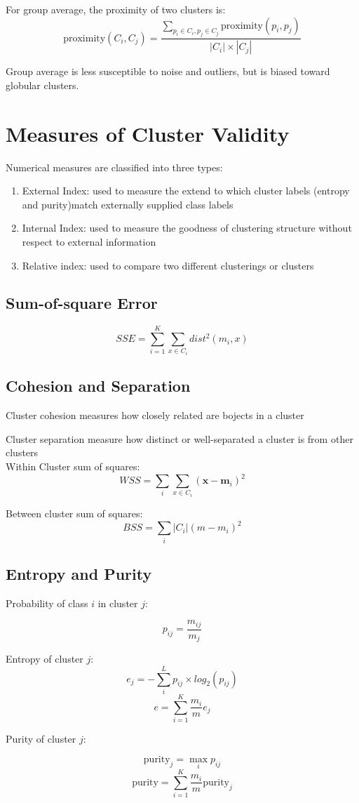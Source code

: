 \begin{multicols*}{2}
\noindent For group average, the proximity of two clusters is:
$$\text{proximity}(C_i, C_j) = \frac{\sum_{p_i \in C_i, p_j \in C_j} \text{proximity}(p_i,p_j)}{|C_i|\times|C_j|}$$

\noindent Group average is less susceptible to noise and outliers, but is biased toward globular clusters. 

\section{Measures of Cluster Validity}

\noindent Numerical measures are classified into three types:

\begin{enumerate}
    \item External Index: used to measure the extend to which cluster labels (entropy and purity)match externally supplied class labels
    \item Internal Index: used to measure the goodness of clustering structure without respect to external information
    \item Relative index: used to compare two different clusterings or clusters
\end{enumerate}

\subsection{Sum-of-square Error}

$$SSE=\sum_{i=1}^K \sum_{x \in C_i} dist^2 (m_i,x)$$

\subsection{Cohesion and Separation}

\noindent Cluster cohesion measures how closely related are bojects in a cluster

\noindent Cluster separation measure how distinct or well-separated a cluster is from other clusters \\

\noindent Within Cluster sum of squares:
$$WSS=\sum_i \sum_{x \in C_i} (\mathbf{x}-\mathbf{m}_i)^2$$

\noindent Between cluster sum of squares:
$$BSS=\sum_i |C_i| (m-m_i)^2$$

\subsection{Entropy and Purity}

\noindent Probability of class $i$ in cluster $j$:

$$p_{ij} = \frac{m_{ij}}{m_j}$$

\noindent Entropy of cluster $j$:
$$e_j = - \sum_{i}^{L} p_{ij} \times log_2 (p_{ij})$$
$$e = \sum_{i=1}^K \frac{m_i}{m} e_j$$

\noindent Purity of cluster $j$:

$$\text{purity}_j= \!\max_i p_{ij}$$
$$\text{purity} = \sum_{i=1}^K \frac{m_i}{m}\text{purity}_j$$

\end{multicols*}
